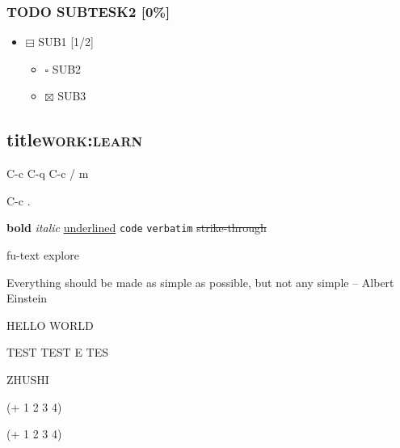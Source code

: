 \documentclass[11pt]{article}
\begin{document}
\subsubsection{{\bfseries\sffamily TODO} SUBTESK2 [0\%]}
\label{sec-2-3-2}
\begin{itemize}
\item $\boxminus$ SUB1 [1/2]
\begin{itemize}
\item $\square$ SUB2
\item $\boxtimes$ SUB3
\end{itemize}
\end{itemize}


\subsection{title\hfill{}\textsc{work:learn}}
\label{sec-2-4}
C-c C-q
C-c / m

C-c . 

\textbf{bold}
\emph{italic}
\uline{underlined}
\texttt{code}
\verb~verbatim~
\sout{strike-through}


fu-text explore


Everything should be made as simple as possible,
but not any simple -- Albert Einstein

HELLO WORLD

TEST
   TEST
E TES

ZHUSHI

(+ 1 2 3 4)


(+ 1 2 3 4)
\end{document}
